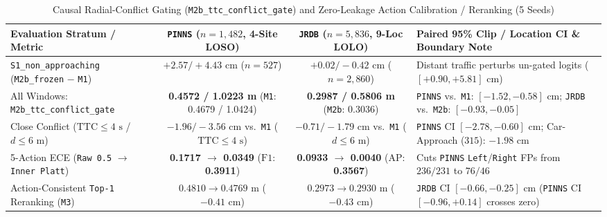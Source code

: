 \documentclass[journal]{IEEEtran}
\begin{document}
\begin{table}[!t]
\centering
\caption{Causal Radial-Conflict Gating (\texttt{M2b\_ttc\_conflict\_gate}) and Zero-Leakage Action Calibration / Reranking (5 Seeds)}
\label{tab:conflict_rerank}
\footnotesize
\begin{tabular}{lccl}
\toprule
Evaluation Stratum / Metric & \texttt{PINNS} ($n = 1{,}482$, 4-Site LOSO) & \texttt{JRDB} ($n = 5{,}836$, 9-Loc LOLO) & Paired 95\% Clip / Location CI \& Boundary Note \\
\midrule
\texttt{S1\_non\_approaching} (\texttt{M2b\_frozen} $-$ \texttt{M1}) & $+2.57 / +4.43\text{ cm}$ ($n = 527$) & $+0.02 / -0.42\text{ cm}$ ($n = 2{,}860$) & Distant traffic perturbs un-gated logits ($[+0.90, +5.81]\text{ cm}$) \\
All Windows: \texttt{M2b\_ttc\_conflict\_gate} & \textbf{0.4572 / 1.0223 m} (\texttt{M1}: 0.4679 / 1.0424) & \textbf{0.2987 / 0.5806 m} (\texttt{M2b}: 0.3036) & \texttt{PINNS} vs.\ \texttt{M1}: $[-1.52, -0.58]\text{ cm}$; \texttt{JRDB} vs.\ \texttt{M2b}: $[-0.93, -0.05]$ \\
Close Conflict ($\text{TTC} \le 4\text{ s}$ / $d \le 6\text{ m}$) & \textbf{$-1.96 / -3.56\text{ cm}$} vs.\ \texttt{M1} ($\text{TTC} \le 4\text{ s}$) & \textbf{$-0.71 / -1.79\text{ cm}$} vs.\ \texttt{M1} ($d \le 6\text{ m}$) & \texttt{PINNS} CI $[-2.78, -0.60]\text{ cm}$; Car-Approach ($315$): $-1.98\text{ cm}$ \\
5-Action ECE (\texttt{Raw 0.5} $\to$ \texttt{Inner Platt}) & \textbf{0.1717 $\to$ 0.0349} ($\text{F1}$: \textbf{0.3911}) & \textbf{0.0933 $\to$ 0.0040} ($\text{AP}$: \textbf{0.3567}) & Cuts \texttt{PINNS} \texttt{Left}/\texttt{Right} FPs from $236/231$ to $76/46$ \\
Action-Consistent \texttt{Top-1} Reranking (\texttt{M3}) & $0.4810 \to 0.4769\text{ m}$ ($-0.41\text{ cm}$) & \textbf{$0.2973 \to 0.2930\text{ m}$} ($-0.43\text{ cm}$) & \texttt{JRDB} CI $[-0.66, -0.25]\text{ cm}$ (\texttt{PINNS} CI $[-0.96, +0.14]$ crosses zero) \\
\bottomrule
\end{tabular}
\end{table}
\end{document}
